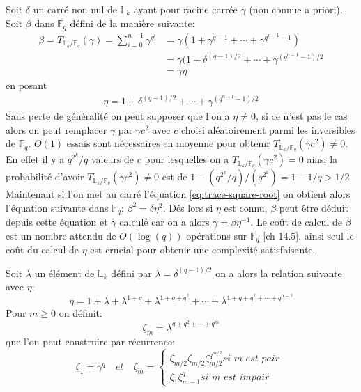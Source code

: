 \documentclass[10pt,a4paper]{book}
\theoremstyle{plain}
\theoremstyle{definition}
\theoremstyle{definition}
\theoremstyle{definition}
\theoremstyle{definition}
\theoremstyle{remark}
\theoremstyle{remark}
\begin{document}
Soit $\delta$ un carré non nul de $\mathbb{L}_k$ ayant pour racine carrée $\gamma$ (non connue a priori). Soit $\beta$ dans $\mathbb{F}_q$ défini de la manière suivante:
\begin{align}
\label{eq:trace-square-root}
\beta=T_{\mathbb{L}_k/\mathbb{F}_q}(\gamma)=\sum_{i=0}^{n-1}\gamma^{q^i}&=\gamma(1+\gamma^{q-1}+\cdots+ \gamma^{q^{n-1}-1} ) \\
&=\gamma(1+\delta^{(q-1)/2}+\cdots+ \gamma^{(q^{n-1}-1)/2} \\
&=\gamma \eta
\end{align}
en posant 
\begin{align*}
\eta=1+\delta^{(q-1)/2}+\cdots+ \gamma^{(q^{n-1}-1)/2}
\end{align*}
Sans perte de généralité on peut supposer que l'on a $\eta \neq 0$, si ce n'est pas le cas alors on peut remplacer $\gamma$ par $\gamma c^2$ avec $c$ choisi aléatoirement parmi les inversibles de $\mathbb{F}_q$.
$O(1)$ essais sont nécessaires en moyenne pour obtenir $T_{\mathbb{L}_k/\mathbb{F}_q}(\gamma c^2) \neq 0$. En effet il y a $q^{2^k}/q$ valeurs de $c$ pour lesquelles on a $T_{\mathbb{L}_k/\mathbb{F}_q}(\gamma c^2) = 0$ ainsi la probabilité d'avoir $T_{\mathbb{L}_k/\mathbb{F}_q}(\gamma c^2) \neq 0$ est de $1-(q^{2^k}/q)/(q^{2^k})=1-1/q>1/2$.
Maintenant si l'on met au carré l'équation \ref{eq:trace-square-root} on obtient alors l'équation suivante dans $\mathbb{F}_q$: $\beta^2=\delta \eta^2$. Dés lors si $\eta$ est connu, $\beta$ peut être déduit depuis cette équation et $\gamma$ calculé car on a alors $\gamma=\beta \eta^{-1}$.
Le coût de calcul de $\beta$ est un nombre attendu de $O(\log(q))$ opérations sur $\mathbb{F}_q$ \cite{vzGJG03}[ch 14.5], ainsi seul le coût du calcul de $\eta$ est crucial pour obtenir une complexité satisfaisante.

Soit $\lambda$ un élément de $\mathbb{L}_k$ défini par $\lambda = \delta^{(q-1)/2} $ on a alors la relation suivante avec $\eta$:
\begin{equation*}
\eta = 1 + \lambda + \lambda^{1+q} + \lambda^{1+q+q^2} + \cdots + \lambda^{1+q+q^2+\cdots+q^{n-2}} 
\end{equation*}
Pour $m \geqslant 0$ on définit:
\begin{equation}
\zeta_m=\lambda^{q+q^2+\cdots+q^{m}} 
\end{equation}
que l'on peut construire par récurrence:
\begin{equation*}
\zeta_1=\gamma^q \quad \textit{et} \quad
\zeta_m=
\begin{cases} 
\zeta_{m/2}  \zeta_{m/2}\zeta_{m/2}^{q^{m/2}} \textit{si m est pair }\\
\zeta_{1}  \zeta_{m-1}^{q} \textit{si m est impair}
\end{cases}
\end{equation*}
\end{document}
